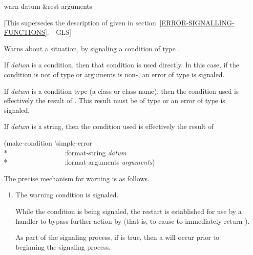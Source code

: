 \begin{defun}[Function]
warn datum &rest arguments

   [This supersedes the description of 
   given in section~\ref{ERROR-SIGNALLING-FUNCTIONS}.---GLS]

  Warns about a situation, by signaling a condition of type .

  If \emph{datum} is a condition, then that condition is used directly.
  In this case, if the condition is not of type  or arguments
  is non-, an error of type  is signaled.

  If \emph{datum} is a condition type (a class or class name), then the condition used is effectively the result
  of . This result
  must be of type  or an error of type  is signaled.

  If \emph{datum} is a string, then the condition used is effectively the result of
\begin{lisp}
(make-condition 'simple-error \\*
~~~~~~~~~~~~~~~~:format-string \emph{datum} \\*
~~~~~~~~~~~~~~~~:format-arguments \emph{arguments})
\end{lisp}

  The precise mechanism for warning is as follows.
\begin{enumerate}

%
\item The warning condition is signaled.

     While the  condition is being signaled, the 
     restart is established for use by a handler to bypass further action
     by  (that is, to cause  to immediately return ).

     As part of the signaling process, if
     is true, then a  will occur prior to beginning the signaling
     process.


\end{enumerate}
\end{defun}
